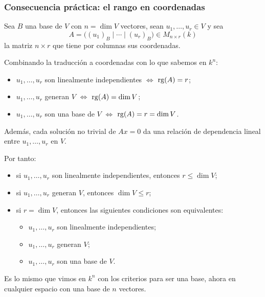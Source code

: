 \begin{frame}[allowframebreaks,t]
    \frametitle{Consecuencia práctica: el rango en coordenadas}

    Sea \(B\) una base de \(V\) con \(n=\dim V\) vectores, sean
    \(u_1,\ldots,u_r\in V\) y sea
    \[
        A=\bigl((u_1)_B\mid\cdots\mid(u_r)_B\bigr)\in M_{n\times r}(k)
    \]
    la matriz $n\times r$ que tiene por columnas sus coordenadas.

    \medskip

    Combinando la traducción a coordenadas con lo que sabemos en \(k^n\):
    \begin{itemize}
        \item \(u_1,\ldots,u_r\) son linealmente independientes
              \(\iff\) \(\operatorname{rg}(A)=r\);
        \item \(u_1,\ldots,u_r\) generan \(V\)
              \(\iff\) \(\operatorname{rg}(A)=\dim V\);
        \item \(u_1,\ldots,u_r\) son una base de \(V\)
              \(\iff\) \(\operatorname{rg}(A)=r=\dim V\).
    \end{itemize}

    \medskip

    Además, cada solución no trivial de \(Ax=0\) da una relación de
    dependencia lineal entre \(u_1,\ldots,u_r\) \alert{en \(V\)}.

    \framebreak

    Por tanto:
    \begin{itemize}
        \item si \(u_1,\ldots,u_r\) son linealmente independientes,
              entonces \(r\leq \dim V\);
        \item si \(u_1,\ldots,u_r\) generan \(V\),
              entonces \(\dim V\leq r\);
        \item si \(r=\dim V\), entonces las siguientes condiciones son equivalentes:
        \begin{itemize}
            \item \(u_1,\ldots,u_r\) son linealmente independientes;
            \item \(u_1,\ldots,u_r\) generan \(V\);
            \item \(u_1,\ldots,u_r\) son una base de \(V\).
        \end{itemize}
    \end{itemize}

    \medskip

    Es lo mismo que vimos en \(k^n\) con los criterios para ser una base,
    ahora en cualquier espacio con una base de \(n\) vectores.
\end{frame}


